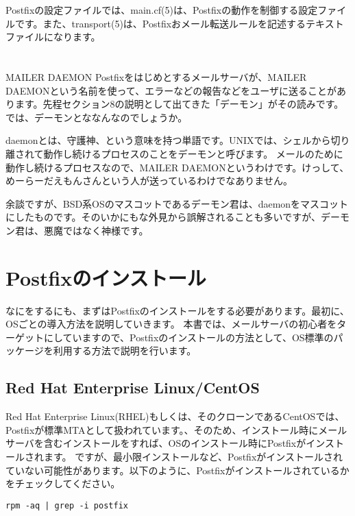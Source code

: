 Postfixの設定ファイルでは、main.cf(5)は、Postfixの動作を制御する設定ファイルです。また、transport(5)は、Postfixおメール転送ルールを記述するテキストファイルになります。

\section*{}
\begin{itembox}[l]{MAILER DAEMON}
Postfixをはじめとするメールサーバが、MAILER DAEMONという名前を使って、エラーなどの報告などをユーザに送ることがあります。先程セクション8の説明として出てきた「デーモン」がその読みです。では、デーモンとななんなのでしょうか。

daemonとは、守護神、という意味を持つ単語です。UNIXでは、シェルから切り離されて動作し続けるプロセスのことをデーモンと呼びます。
メールのために動作し続けるプロセスなので、MAILER DAEMONというわけです。けっして、めーらーだえもんさんという人が送っているわけでなありません。

余談ですが、BSD系OSのマスコットであるデーモン君は、daemonをマスコットにしたものです。そのいかにもな外見から誤解されることも多いですが、デーモン君は、悪魔ではなく神様です。

\end{itembox}

\section{Postfixのインストール}
なにをするにも、まずはPostfixのインストールをする必要があります。最初に、OSごとの導入方法を説明していきます。
本書では、メールサーバの初心者をターゲットにしていますので、Postfixのインストールの方法として、OS標準のパッケージを利用する方法で説明を行います。

\subsection{Red Hat Enterprise Linux/CentOS}
Red Hat Enterprise Linux(RHEL)もしくは、そのクローンであるCentOSでは、Postfixが標準MTAとして扱われています。、そのため、インストール時にメールサーバを含むインストールをすれば、OSのインストール時にPostfixがインストールされます。
ですが、最小限インストールなど、Postfixがインストールされていない可能性があります。以下のように、Postfixがインストールされているかをチェックしてください。

\begin{verbatim}
rpm -aq | grep -i postfix
\end{verbatim}


